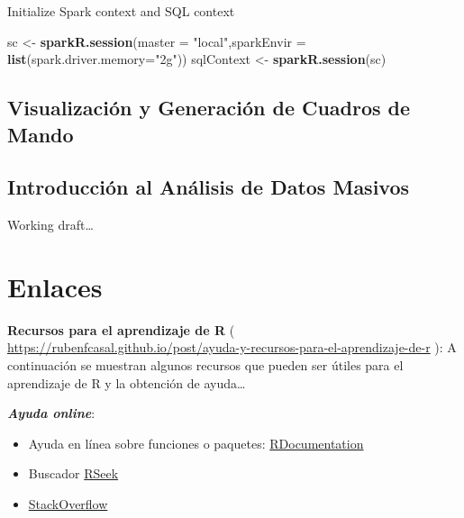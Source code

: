 \documentclass[]{book}
\newenvironment{Shaded}{\begin{snugshade}}{\end{snugshade}}
\newcommand{\DataTypeTok}[1]{\textcolor[rgb]{0.13,0.29,0.53}{#1}}
\newcommand{\KeywordTok}[1]{\textcolor[rgb]{0.13,0.29,0.53}{\textbf{#1}}}
\newcommand{\NormalTok}[1]{#1}
\newcommand{\StringTok}[1]{\textcolor[rgb]{0.31,0.60,0.02}{#1}}
\begin{document}
Initialize Spark context and SQL context

\begin{Shaded}
\begin{Highlighting}[]
\NormalTok{sc <-}\StringTok{ }\KeywordTok{sparkR.session}\NormalTok{(}\DataTypeTok{master =} \StringTok{"local"}\NormalTok{,}\DataTypeTok{sparkEnvir =} \KeywordTok{list}\NormalTok{(}\DataTypeTok{spark.driver.memory=}\StringTok{"2g"}\NormalTok{))}
\NormalTok{sqlContext <-}\StringTok{ }\KeywordTok{sparkR.session}\NormalTok{(sc)}
\end{Highlighting}
\end{Shaded}

\hypertarget{visualizacion-y-generacion-de-cuadros-de-mando}{%
\section{Visualización y Generación de Cuadros de Mando}\label{visualizacion-y-generacion-de-cuadros-de-mando}}

\hypertarget{introduccion-al-analisis-de-datos-masivos}{%
\section{Introducción al Análisis de Datos Masivos}\label{introduccion-al-analisis-de-datos-masivos}}

\hypertarget{appendix-apendices}{%
\appendix}


Working draft\ldots{}

\hypertarget{links}{%
\chapter{Enlaces}\label{links}}

\textbf{Recursos para el aprendizaje de R} ( \url{https://rubenfcasal.github.io/post/ayuda-y-recursos-para-el-aprendizaje-de-r}
): A continuación se muestran algunos recursos que pueden ser útiles para el aprendizaje de R y la obtención de ayuda\ldots{}

\textbf{\emph{Ayuda online}}:

\begin{itemize}
\item
  Ayuda en línea sobre funciones o paquetes: \href{https://www.rdocumentation.org/}{RDocumentation}
\item
  Buscador \href{http://rseek.org/}{RSeek}
\item
  \href{http://stackoverflow.com/questions/tagged/r}{StackOverflow}
\end{itemize}
\end{document}
